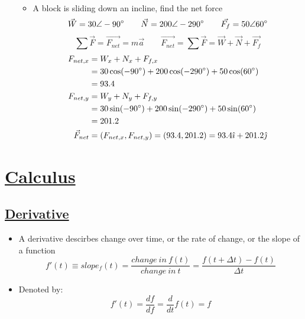 \documentclass{article}
\begin{document}
\begin{itemize}
\begin{itemize}
\begin{align*}
    \end{align*}
    \item A block is sliding down an incline, find the net force
    \begin{equation*}
      \vec{W} = 30\angle-90\degree\qquad \vec{N} = 200\angle-290\degree\qquad \vec{F_{f}} = 50\angle60\degree
    \end{equation*}
    \begin{equation*}
      \sum\vec{F} = \vec{F_{net}} = m\vec{a}\qquad \vec{F_{net}} = \sum\vec{F} = \vec{W}+\vec{N}+\vec{F_{f}}
    \end{equation*}
    \begin{align*}
      F_{net,x} &= W_{x} + N_{x} + F_{f,x}\\
      &= 30\cos(-90\degree) + 200\cos(-290\degree) + 50\cos(60\degree)\\
      &= 93.4\\
      F_{net,y} &= W_{y} + N_{y} + F_{f,y}\\
      &= 30\sin(-90\degree) + 200\sin(-290\degree) + 50\sin(60\degree)\\
      &= 201.2\\
      \vec{F}_{net} &= (F_{net,x}, F_{net,y}) = (93.4, 201.2) = 93.4\hat{\imath} + 201.2\hat{\jmath}
    \end{align*}
  \end{itemize}
\end{itemize}

\section{\underline{Calculus}}
\subsection{\underline{Derivative}}
\begin{itemize}
  \item A derivative descirbes change over time, or the rate of change, or the slope of a function
  \begin{equation*}
    f\prime(t) \equiv slope_{f}(t) = \frac{change\ in\ f(t)}{change\ in\ t} = \frac{f(t + \Delta t) - f(t)}{\Delta t}
  \end{equation*}
  \item Denoted by:
  \begin{equation*}
    f\prime(t) = \frac{df}{df} = \frac{d}{dt}f(t) = f
  \end{equation*}
\end{itemize}
\end{document}
